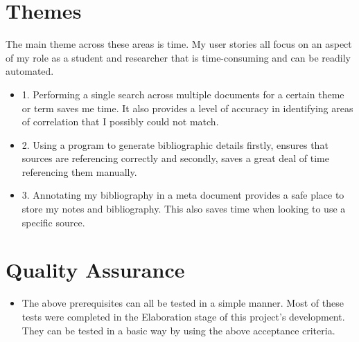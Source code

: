 \documentclass[a4paper,12pt]{article}
\begin{document}
\section{Themes}


The main theme across these areas is time. My user stories all focus on an aspect of my role as a student and researcher that is time-consuming and can be readily automated. 


\begin{itemize}


\item 1. Performing a single search across multiple documents for a certain theme or term saves me time. It also provides a level of accuracy in identifying areas of correlation that I possibly could not match. 

\item 2. Using a program to generate bibliographic details firstly, ensures that sources are referencing correctly and secondly, saves a great deal of time referencing them manually. 

\item 3. Annotating my bibliography in a meta document provides a safe place to store my notes and bibliography. This also saves time when looking to use a specific source. 

    
\end{itemize}


\section{Quality Assurance}


\begin{itemize} 


\item The above prerequisites can all be tested in a simple manner. Most of these tests were completed in the Elaboration stage of this project's development. They can be tested in a basic way by using the above acceptance criteria. 


\end{itemize} 
\end{document}
